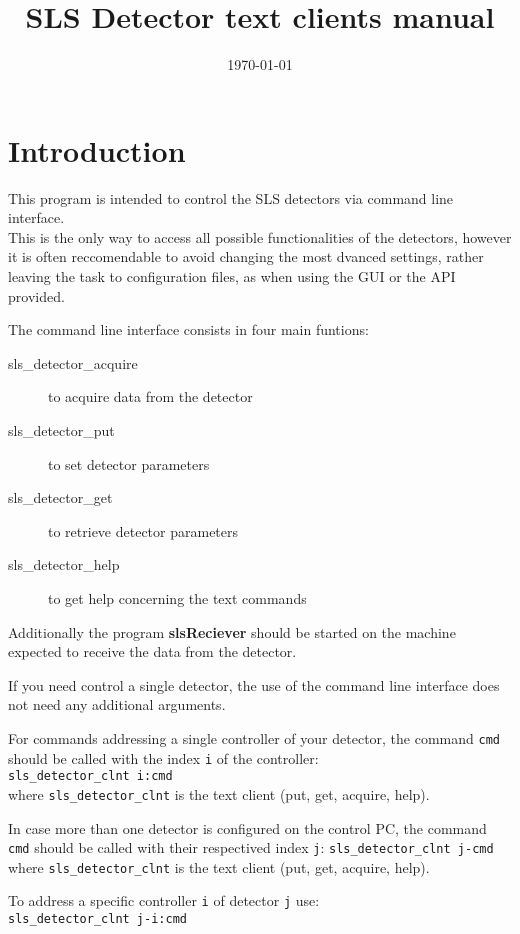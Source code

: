 \documentclass{article}
\begin{document}
\title{SLS Detector text clients manual}
\date{\today}
\maketitle



\section{Introduction}

This program is intended to control the SLS detectors via command line interface.\\
This is the only way to access all possible functionalities of the detectors, however it is often reccomendable to avoid changing the most dvanced settings, rather leaving the task to configuration files, as when using the GUI or the API provided.

The command line interface consists in four main funtions:
\begin{description}
\item[sls\_detector\_acquire] to acquire data from the detector
\item[sls\_detector\_put] to set detector parameters
\item[sls\_detector\_get] to retrieve detector parameters
\item[sls\_detector\_help] to get help concerning the text commands
\end{description}
Additionally the program \textbf{slsReciever} should be started on the machine expected to receive the data from the detector.


If you need control a single detector, the use of the command line interface does not need any additional arguments.

For commands addressing a single controller of your detector, the command  \verb=cmd= should be called with the index \verb=i= of the controller:\\
\verb=sls_detector_clnt i:cmd=\\
where \verb=sls_detector_clnt= is the text client (put, get, acquire, help).

In case more than one detector is configured on the control PC, the command  \verb=cmd= should be called with their respectived index  \verb=j=:
\verb=sls_detector_clnt j-cmd=\\
where \verb=sls_detector_clnt= is the text client (put, get, acquire, help).

To address a specific controller \verb=i= of detector \verb=j= use:\\
\verb=sls_detector_clnt j-i:cmd=
\end{document}
